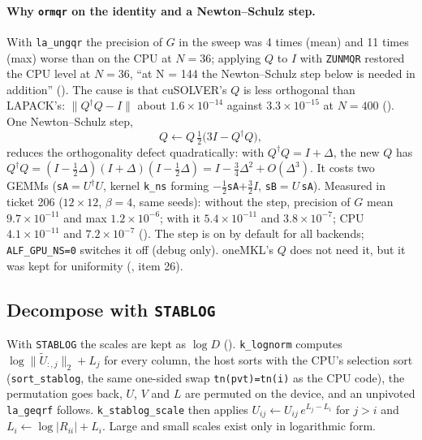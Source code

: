 \paragraph{Why \texttt{ormqr} on the identity and a Newton--Schulz step.} With \texttt{la\_ungqr} the precision of $G$ in the sweep was 4 times (mean) and 11 times (max) worse than on the CPU at $N=36$; applying $Q$ to $I$ with \texttt{ZUNMQR} restored the CPU level at $N=36$, ``at N = 144 the Newton--Schulz step below is needed in addition'' (). The cause is that cuSOLVER's $Q$ is less orthogonal than LAPACK's: $\|Q^\dagger Q-I\|$ about $1.6\times10^{-14}$ against $3.3\times10^{-15}$ at $N=400$ (). %
One Newton--Schulz step,
\begin{equation}
Q \leftarrow Q\,\tfrac12\bigl(3I - Q^\dagger Q\bigr),
\end{equation}
reduces the orthogonality defect quadratically: with $Q^\dagger Q = I+\Delta$, the new $Q$ has $Q^\dagger Q = (I-\tfrac12\Delta)(I+\Delta)(I-\tfrac12\Delta) = I-\tfrac34\Delta^2+O(\Delta^3)$. It costs two GEMMs (\texttt{sA}$=U^\dagger U$, kernel \texttt{k\_ns} forming $-\tfrac12$\texttt{sA}$+\tfrac32I$, \texttt{sB}$=U\,$\texttt{sA}). Measured in ticket 206 ($12\times12$, $\beta=4$, same seeds): without the step, precision of $G$ mean $9.7\times10^{-11}$ and max $1.2\times10^{-6}$; with it $5.4\times10^{-11}$ and $3.8\times10^{-7}$; CPU $4.1\times10^{-11}$ and $7.2\times10^{-7}$ (). The step is on by default for all backends; \texttt{ALF\_GPU\_NS=0} switches it off (debug only). oneMKL's $Q$ does not need it, but it was kept for uniformity (, item 26).

\subsection{Decompose with \texttt{STABLOG}}

With \texttt{STABLOG} the scales are kept as $\log D$ (). \texttt{k\_lognorm} computes $\log\|\tilde U_{:,j}\|_2+L_j$ for every column, the host sorts with the CPU's selection sort (\texttt{sort\_stablog}, the same one-sided swap \texttt{tn(pvt)=tn(i)} as the CPU code), the permutation goes back, $U$, $V$ and $L$ are permuted on the device, and an unpivoted \texttt{la\_geqrf} follows. \texttt{k\_stablog\_scale} then applies $U_{ij}\leftarrow U_{ij}\,e^{L_j-L_i}$ for $j>i$ and $L_i\leftarrow\log|R_{ii}|+L_i$. Large and small scales exist only in logarithmic form.

